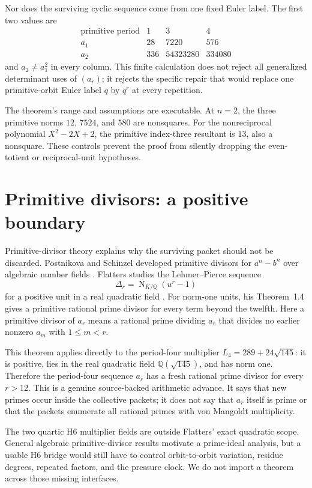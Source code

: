 \documentclass[11pt]{article}
\theoremstyle{definition}\newtheorem{definition}[theorem]{Definition}
\theoremstyle{remark}\newtheorem{remark}[theorem]{Remark}
\DeclareMathOperator{\FieldNorm}{N}
\begin{document}
Nor does the surviving cyclic sequence come from one fixed Euler label.  The
first two values are
\[
\begin{array}{c|rrr}
\text{primitive period}&1&3&4\\\hline
a_1&28&7220&576\\
a_2&336&54323280&334080
\end{array}
\]
and $a_2\ne a_1^2$ in every column.  This finite calculation does not reject
all generalized determinant uses of $(a_r)$; it rejects the specific repair
that would replace one primitive-orbit Euler label $q$ by $q^r$ at every
repetition.

The theorem's range and assumptions are executable.  At $n=2$, the three
primitive norms $12$, $7524$, and $580$ are nonsquares.  For the
nonreciprocal polynomial $X^2-2X+2$, the primitive index-three resultant is
$13$, also a nonsquare.  These controls prevent the proof from silently
dropping the even-totient or reciprocal-unit hypotheses.

\section{Primitive divisors: a positive boundary}

Primitive-divisor theory explains why the surviving packet should not be
discarded.  Postnikova and Schinzel developed primitive divisors for
$a^n-b^n$ over algebraic number fields \cite{postnikova1968primitive}.
Flatters studies the Lehmer--Pierce sequence
\[
\Delta_r=\FieldNorm_{K/\mathbb Q}(u^r-1)
\]
for a positive unit in a real quadratic field \cite{flatters2007primitive}.
For norm-one units, his Theorem~1.4 gives a primitive rational prime divisor
for every term beyond the twelfth.  Here a primitive divisor of $a_r$ means a
rational prime dividing $a_r$ that divides no earlier nonzero $a_m$ with
$1\le m<r$.

This theorem applies directly to the period-four multiplier
$L_4=289+24\sqrt{145}$: it is positive, lies in the real quadratic field
$\mathbb Q(\sqrt{145})$, and has norm one.  Therefore the period-four
sequence $a_r$ has a fresh rational prime divisor for every $r>12$.  This is
a genuine source-backed arithmetic advance.  It says that new primes occur
inside the collective packets; it does not say that $a_r$ itself is prime or
that the packets enumerate all rational primes with von Mangoldt
multiplicity.

The two quartic H6 multiplier fields are outside Flatters' exact quadratic
scope.  General algebraic primitive-divisor results motivate a prime-ideal
analysis, but a usable H6 bridge would still have to control orbit-to-orbit
variation, residue degrees, repeated factors, and the pressure clock.  We do
not import a theorem across those missing interfaces.
\end{document}
